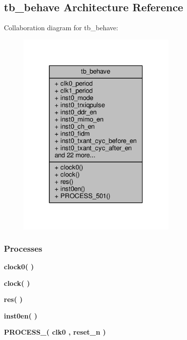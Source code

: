 \subsection{tb\+\_\+behave Architecture Reference}
\label{classfifo2diq__tb_1_1tb__behave}


Collaboration diagram for tb\+\_\+behave\+:\nopagebreak
\begin{figure}[H]
\begin{center}
\leavevmode
\includegraphics[width=223pt]{d7/d12/classfifo2diq__tb_1_1tb__behave__coll__graph}
\end{center}
\end{figure}
\subsubsection*{Processes}
 \begin{DoxyCompactItemize}
\item 
{\bf clock0}{\bfseries  (  )}
\item 
{\bf clock}{\bfseries  (  )}
\item 
{\bf res}{\bfseries  (  )}
\item 
{\bf inst0en}{\bfseries  (  )}
\item 
{\bf P\+R\+O\+C\+E\+S\+S\+\_}{\bfseries  ( {\bfseries {\bfseries {\bf clk0}} \textcolor{vhdlchar}{ }} , {\bfseries {\bfseries {\bf reset\+\_\+n}} \textcolor{vhdlchar}{ }} )}
\end{DoxyCompactItemize}
